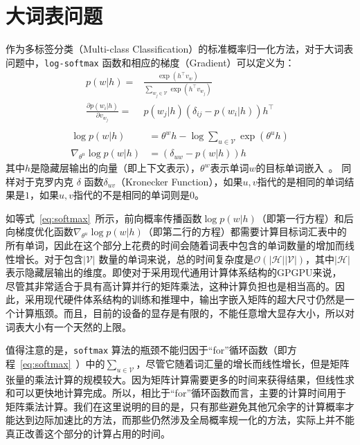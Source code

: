 \section{大词表问题}
作为多标签分类（Multi-class Classification）的标准概率归一化方法，对于大词表问题中，\texttt{log-softmax} 函数和相应的梯度（Gradient）可以定义为：
\begin{equation}
\begin{split}
p(w|h)=&\frac{\exp(h^\top v_{w})}{\sum_{w_j\in \mathcal{V}}{\exp(h^\top v_{w_j} )}} \\
\frac{\partial p(w_i|h)}{\partial v_{w_j}}=&p(w_j|h)(\delta_{ij}-p(w_i|h))h^\top\\
\end{split}
\end{equation}
\begin{equation}
\label{eq:softmax}
\begin{split}
\log p(w|h) &= \theta^w h-\log \sum_{u\in \mathcal{V}}{\exp(\theta^u h)}\\
\nabla_{\theta^u}{\log p(w|h)}&= (\delta_{uw}-p(w|h))h
\end{split}
\end{equation}
其中$ h $是隐藏层输出的向量（即上下文表示），$ \theta ^ w $表示单词$ w $的目标单词嵌入~。 同样对于克罗内克 $\delta$ 函数$ \delta_ {uv} $（Kronecker Function），如果$ u,v $指代的是相同的单词结果是$ 1 $，如果$ u,v $指代的不是相同的单词则是$ 0 $。


如等式~\ref{eq:softmax}~所示，前向概率传播函数$\log p(w|h) $（即第一行方程）和后向梯度优化函数$\nabla_{\theta^u}{\log p(w|h)}$（即第二行的方程）都需要计算目标词汇表中的所有单词，因此在这个部分上花费的时间会随着词表中包含的单词数量的增加而线性增长。对于包含$ \mathcal{| V |} $ 数量的单词来说，总的时间复杂度是$ \mathcal {O}(\mathcal {| H || V |})$，其中$ \mathcal {| H |} $表示隐藏层输出的维度。即使对于采用现代通用计算体系结构的GPGPU来说， 尽管其非常适合于具有高计算并行的矩阵乘法，这种计算负担也是相当高的。因此，采用现代硬件体系结构的训练和推理中，输出字嵌入矩阵的超大尺寸仍然是一个计算瓶颈。而且，目前的设备的显存是有限的，不能任意增大显存大小，所以对词表大小有一个天然的上限。

值得注意的是，\texttt{softmax} 算法的瓶颈不能归因于``for''循环函数（即方程~\ref{eq:softmax}~）中的$ \sum_ {u \in \mathcal {V}} $，尽管它随着词汇量的增长而线性增长，但是矩阵张量的乘法计算的规模较大。因为矩阵计算需要更多的时间来获得结果，但线性求和可以更快地计算完成。所以，相比于``for''循环函数而言，主要的计算时间用于矩阵乘法计算。我们在这里说明的目的是，只有那些避免其他冗余字的计算概率才能达到边际加速比的方法，而那些仍然涉及全局概率规一化的方法，实际上并不能真正改善这个部分的计算占用的时间。

